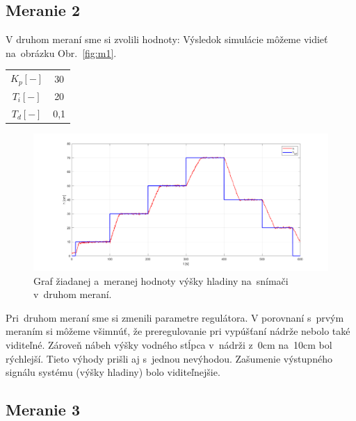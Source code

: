 \documentclass{article}
\begin{document}
\clearpage

\subsection{Meranie 2}
\label{sec:meranie2}

V druhom meraní sme si zvolili hodnoty:
Výsledok simulácie môžeme vidieť na~obrázku Obr.~\ref{fig:m1}.

\begin{center}
\begin{tabular}{ |c|c| }
 \hline
 $K_p [-]$ & 30 \\
 $T_i [-]$ & 20 \\
 $T_d [-]$ & 0,1 \\
 \hline
\end{tabular}
\end{center}

\begin{figure}[!htbp]
	\begin{center}
		\includegraphics[width=\textwidth]{./include/meranie2.png}
	\end{center}
	\caption{Graf žiadanej a~meranej hodnoty výšky hladiny na~snímači v~druhom meraní.}
	\label{fig:m2}
\end{figure}

Pri~druhom meraní sme si zmenili parametre regulátora. V porovnaní s~prvým meraním si môžeme všimnúť,
že preregulovanie pri vypúšťaní nádrže nebolo také viditeľné. Zároveň nábeh výšky vodného stĺpca v~nádrži
z~0cm na~10cm bol rýchlejší. Tieto výhody prišli aj s~jednou nevýhodou. Zašumenie výstupného signálu
systému (výšky hladiny) bolo viditeľnejšie.

\clearpage

\subsection{Meranie 3}
\label{sec:meranie3}
\end{document}
